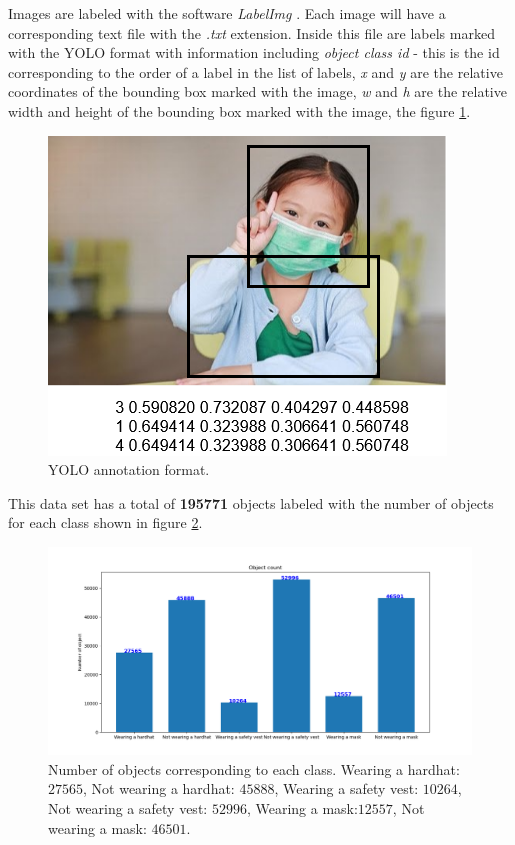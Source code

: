 \documentclass[conference]{IEEEtran}
\begin{document}
Images are labeled with the software \emph{LabelImg} \cite{tzu:2018:labelimg}. Each image will have a corresponding text file with the \emph{.txt} extension. Inside this file are labels marked with the YOLO format with information including \emph{object class id} - this is the id corresponding to the order of a label in the list of labels, \emph{x} and \emph{y} are the relative coordinates of the bounding box marked with the image, \emph{w} and \emph{h} are the relative width and height of the bounding box marked with the image, the figure \ref{fig:yolo_annotation}.
\begin{figure}[ht]
	\centerline{\includegraphics[scale=0.6]{images/yolo_annotation.png}}
  	\caption{YOLO annotation format.}
  	\label{fig:yolo_annotation}
\end{figure}
This data set has a total of \textbf{195771} objects labeled with the number of objects for each class shown in figure \ref{fig:object_count}.
\begin{figure}[ht]
	\centerline{\includegraphics[scale=0.3]{images/object_count.png}}
  	\caption{Number of objects corresponding to each class. Wearing a hardhat: $27565$, Not wearing a hardhat: $45888$, Wearing a safety vest: $10264$, Not wearing a safety vest: $52996$, Wearing a mask:$12557$, Not wearing a mask: $46501$.}
  	\label{fig:object_count}
\end{figure}
\end{document}
